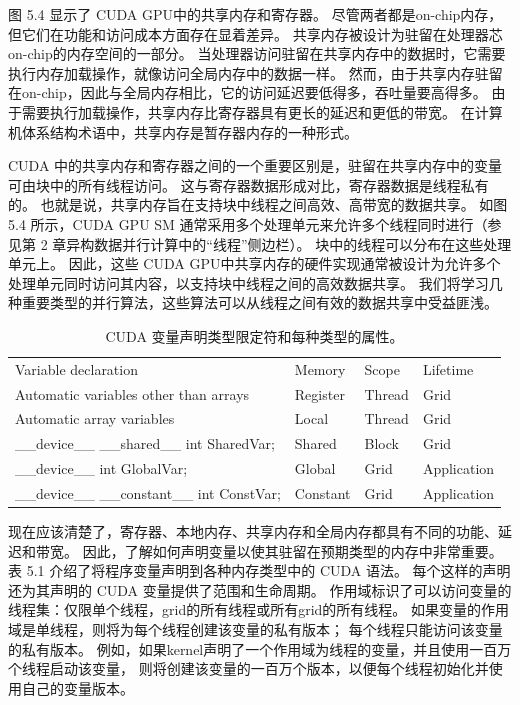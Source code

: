 图 5.4 显示了 CUDA GPU中的共享内存和寄存器。 尽管两者都是on-chip内存，但它们在功能和访问成本方面存在显着差异。 
共享内存被设计为驻留在处理器芯on-chip的内存空间的一部分。 
当处理器访问驻留在共享内存中的数据时，它需要执行内存加载操作，就像访问全局内存中的数据一样。 
然而，由于共享内存驻留在on-chip，因此与全局内存相比，它的访问延迟要低得多，吞吐量要高得多。 
由于需要执行加载操作，共享内存比寄存器具有更长的延迟和更低的带宽。 
在计算机体系结构术语中，共享内存是暂存器内存的一种形式。

CUDA 中的共享内存和寄存器之间的一个重要区别是，驻留在共享内存中的变量可由块中的所有线程访问。 
这与寄存器数据形成对比，寄存器数据是线程私有的。 也就是说，共享内存旨在支持块中线程之间高效、高带宽的数据共享。 
如图 5.4 所示，CUDA GPU SM 通常采用多个处理单元来允许多个线程同时进行（参见第 2 章异构数据并行计算中的“线程”侧边栏）。 
块中的线程可以分布在这些处理单元上。 
因此，这些 CUDA GPU中共享内存的硬件实现通常被设计为允许多个处理单元同时访问其内容，以支持块中线程之间的高效数据共享。 
我们将学习几种重要类型的并行算法，这些算法可以从线程之间有效的数据共享中受益匪浅。

\begin{table}[H]
\centering
\begin{tabular}{l|l|l|l}
	Variable declaration & Memory & Scope & Lifetime \\
	Automatic variables other than arrays & Register & Thread & Grid \\
	Automatic array variables & Local & Thread & Grid \\
	\_\_device\_\_ \_\_shared\_\_ int SharedVar; & Shared & Block & Grid \\
	\_\_device\_\_ int GlobalVar; & Global & Grid & Application \\
	\_\_device\_\_ \_\_constant\_\_ int ConstVar; & Constant & Grid & Application \\
\hline
\end{tabular}
\caption{CUDA 变量声明类型限定符和每种类型的属性。}
\end{table}

现在应该清楚了，寄存器、本地内存、共享内存和全局内存都具有不同的功能、延迟和带宽。 
因此，了解如何声明变量以使其驻留在预期类型的内存中非常重要。 表 5.1 介绍了将程序变量声明到各种内存类型中的 CUDA 语法。 
每个这样的声明还为其声明的 CUDA 变量提供了范围和生命周期。 
作用域标识了可以访问变量的线程集：仅限单个线程，grid的所有线程或所有grid的所有线程。 
如果变量的作用域是单线程，则将为每个线程创建该变量的私有版本； 每个线程只能访问该变量的私有版本。 
例如，如果kernel声明了一个作用域为线程的变量，并且使用一百万个线程启动该变量，
则将创建该变量的一百万个版本，以便每个线程初始化并使用自己的变量版本。

